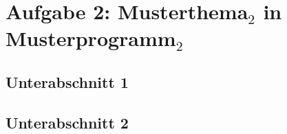 \pagebreak
\section{Aufgabe 2: Musterthema$_2$ in Musterprogramm$_2$}
\subsection{Unterabschnitt 1}
\vspace{1cm}
\subsection{Unterabschnitt 2}
